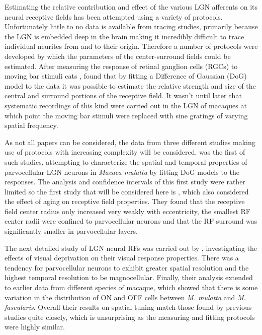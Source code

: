 Estimating the relative contribution and effect of the various LGN
afferents on its neural receptive fields has been attempted using a
variety of protocols. Unfortunately little to no data is available
from tracing studies, primarily because the LGN is embedded deep in
the brain making it incredibly difficult to trace individual neurites
from and to their origin. Therefore a number of protocols were
developed by which the parameters of the center-surround fields could
be estimated. After measuring the response of retinal ganglion cells
(RGCs) to moving bar stimuli cats \citep{Rodieck1965a,Rodieck1965b},
\cite{Rodieck1965} found that by fitting a Difference of Gaussian
(DoG) model to the data it was possible to estimate the relative
strength and size of the central and surround portions of the
receptive field. It wasn't until later that systematic recordings of
this kind were carried out in the LGN of macaques at which point the
moving bar stimuli were replaced with sine gratings of varying spatial
frequency.

As not all papers can be considered, the data from three different
studies making use of protocols with increasing complexity will be
considered. \cite{Derrington1984} was the first of such studies,
attempting to characterize the spatial and temporal properties of
parvocellular LGN neurons in \emph{Macaca mulatta} by fitting DoG
models to the responses. The analysis and confidence intervals of this
first study were rather limited so the first study that will be
considered here is \cite{Spear1994}, which also considered the effect
of aging on receptive field properties. They found that the receptive
field center radius only increased very weakly with eccentricity, the
smallest RF center radii were confined to parvocellular neurons and
that the RF surround was significantly smaller in parvocellular
layers.

The next detailed study of LGN neural RFs was carried out by
\cite{Levitt2001}, investigating the effects of visual deprivation on
their visual response properties. There was a tendency for
parvocellular neurons to exhibit greater spatial resolution and the
highest temporal resolution to be magnocellular. Finally, their
analysis extended to earlier data from different species of macaque,
which showed that there is some variation in the distribution of ON
and OFF cells between \emph{M. mulatta} and
\emph{M. fascularis}. Overall their results on spatial tuning match
those found by previous studies quite closely, which is unsurprising
as the measuring and fitting protocols were highly similar.

